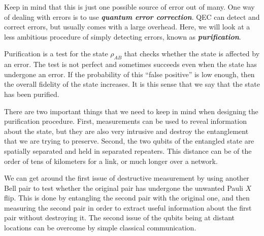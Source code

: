Keep in mind that this is just one possible source of error out of many.
One way of dealing with errors is to use \textbf{\emph{quantum error correction}}.
QEC can detect and correct errors, but usually comes with a large overhead.
Here, we will look at a less ambitious procedure of simply detecting errors, known as \textit{\textbf{purification}}.

Purification is a test for the state $\rho_{AB}$ that checks whether the state is affected by an error.
The test is not perfect and sometimes succeeds even when the state has undergone an error.
If the probability of this ``false positive'' is low enough, then the overall fidelity of the state increases.
It is this sense that we say that the state has been purified.

There are two important things that we need to keep in mind when designing the purification procedure.
First, measurements can be used to reveal information about the state, but they are also very intrusive and destroy the entanglement that we are trying to preserve.
Second, the two qubits of the entangled state are spatially separated and held in separated repeaters.
This distance can be of the order of tens of kilometers for a link, or much longer over a network.

We can get around the first issue of destructive measurement by using another Bell pair to test whether the original pair has undergone the unwanted Pauli $X$ flip.
This is done by entangling the second pair with the original one, and then measuring the second pair in order to extract useful information about the first pair without destroying it.
The second issue of the qubits being at distant locations can be overcome by simple classical communication.

